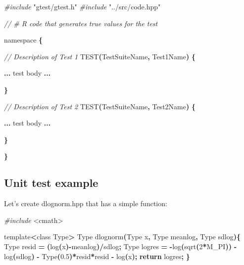 \documentclass[
]{book}
\newenvironment{Shaded}{\begin{snugshade}}{\end{snugshade}}
\newcommand{\CommentTok}[1]{\textcolor[rgb]{0.56,0.35,0.01}{\textit{#1}}}
\newcommand{\ControlFlowTok}[1]{\textcolor[rgb]{0.13,0.29,0.53}{\textbf{#1}}}
\newcommand{\DecValTok}[1]{\textcolor[rgb]{0.00,0.00,0.81}{#1}}
\newcommand{\FloatTok}[1]{\textcolor[rgb]{0.00,0.00,0.81}{#1}}
\newcommand{\ImportTok}[1]{#1}
\newcommand{\NormalTok}[1]{#1}
\newcommand{\OperatorTok}[1]{\textcolor[rgb]{0.81,0.36,0.00}{\textbf{#1}}}
\newcommand{\PreprocessorTok}[1]{\textcolor[rgb]{0.56,0.35,0.01}{\textit{#1}}}
\begin{document}
\begin{Shaded}
\begin{Highlighting}[]
\PreprocessorTok{\#include }\ImportTok{"gtest/gtest.h"}
\PreprocessorTok{\#include }\ImportTok{"../src/code.hpp"}

\CommentTok{// \# R code that generates true values for the test}

\NormalTok{namespace }\OperatorTok{\{}

  \CommentTok{// Description of Test 1 }
\NormalTok{  TEST}\OperatorTok{(}\NormalTok{TestSuiteName}\OperatorTok{,}\NormalTok{ Test1Name}\OperatorTok{)} \OperatorTok{\{}
    
    \OperatorTok{...}\NormalTok{ test body }\OperatorTok{...} 
    
  \OperatorTok{\}}
  
  \CommentTok{// Description of Test 2}
\NormalTok{  TEST}\OperatorTok{(}\NormalTok{TestSuiteName}\OperatorTok{,}\NormalTok{ Test2Name}\OperatorTok{)} \OperatorTok{\{}
    
    \OperatorTok{...}\NormalTok{ test body }\OperatorTok{...}
    
  \OperatorTok{\}}
  
\OperatorTok{\}}
\end{Highlighting}
\end{Shaded}

\hypertarget{unit-test-example}{%
\subsection{Unit test example}\label{unit-test-example}}

Let's create dlognorm.hpp that has a simple function:

\begin{Shaded}
\begin{Highlighting}[]
\PreprocessorTok{\#include }\ImportTok{\textless{}cmath\textgreater{}}

\NormalTok{template}\OperatorTok{\textless{}}\NormalTok{class Type}\OperatorTok{\textgreater{}}
\NormalTok{Type dlognorm}\OperatorTok{(}\NormalTok{Type x}\OperatorTok{,}\NormalTok{ Type meanlog}\OperatorTok{,}\NormalTok{ Type sdlog}\OperatorTok{)\{}
\NormalTok{  Type resid }\OperatorTok{=} \OperatorTok{(}\NormalTok{log}\OperatorTok{(}\NormalTok{x}\OperatorTok{){-}}\NormalTok{meanlog}\OperatorTok{)/}\NormalTok{sdlog}\OperatorTok{;}
\NormalTok{  Type logres }\OperatorTok{=} \OperatorTok{{-}}\NormalTok{log}\OperatorTok{(}\NormalTok{sqrt}\OperatorTok{(}\DecValTok{2}\OperatorTok{*}\NormalTok{M\_PI}\OperatorTok{))} \OperatorTok{{-}}\NormalTok{ log}\OperatorTok{(}\NormalTok{sdlog}\OperatorTok{)} \OperatorTok{{-}}\NormalTok{ Type}\OperatorTok{(}\FloatTok{0.5}\OperatorTok{)*}\NormalTok{resid}\OperatorTok{*}\NormalTok{resid }\OperatorTok{{-}}\NormalTok{ log}\OperatorTok{(}\NormalTok{x}\OperatorTok{);}
  \ControlFlowTok{return}\NormalTok{ logres}\OperatorTok{;} 
\OperatorTok{\}}
\end{Highlighting}
\end{Shaded}
\end{document}
